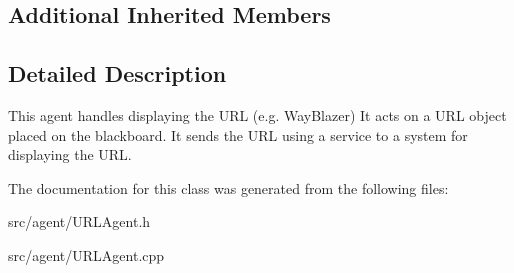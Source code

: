 \subsection*{Additional Inherited Members}


\subsection{Detailed Description}
This agent handles displaying the U\+RL (e.\+g. Way\+Blazer) It acts on a U\+RL object placed on the blackboard. It sends the U\+RL using a service to a system for displaying the U\+RL. 

The documentation for this class was generated from the following files\+:\begin{DoxyCompactItemize}
\item 
src/agent/U\+R\+L\+Agent.\+h\item 
src/agent/U\+R\+L\+Agent.\+cpp\end{DoxyCompactItemize}
